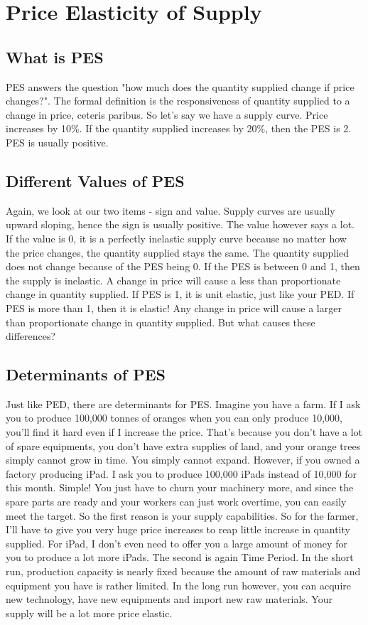 \section{Price Elasticity of Supply}
\subsection{What is PES}
PES answers the question "how much does the quantity supplied change if price changes?". The formal definition is the responsiveness of quantity supplied to a change in price, ceteris paribus. So let's say we have a supply curve. Price increases by 10\%. If the quantity supplied increases by 20\%, then the PES is 2. PES is usually positive.
\subsection{Different Values of PES}
Again, we look at our two items - sign and value. Supply curves are usually upward sloping, hence the sign is usually positive. The value however says a lot. If the value is 0, it is a perfectly inelastic supply curve because no matter how the price changes, the quantity supplied stays the same. The quantity supplied does not change because of the PES being 0. If the PES is between 0 and 1, then the supply is inelastic. A change in price will cause a less than proportionate change in quantity supplied. If PES is 1, it is unit elastic, just like your PED. If PES is more than 1, then it is elastic! Any change in price will cause a larger than proportionate change in quantity supplied. But what causes these differences?
\subsection{Determinants of PES}
Just like PED, there are determinants for PES. Imagine you have a farm. If I ask you to produce 100,000 tonnes of oranges when you can only produce 10,000, you'll find it hard even if I increase the price. That's because you don't have a lot of spare equipments, you don't have extra supplies of land, and your orange trees simply cannot grow in time. You simply cannot expand. However, if you owned a factory producing iPad. I ask you to produce 100,000 iPads instead of 10,000 for this month. Simple! You just have to churn your machinery more, and since the spare parts are ready and your workers can just work overtime, you can easily meet the target. So the first reason is your supply capabilities. So for the farmer, I'll have to give you very huge price increases to reap little increase in quantity supplied. For iPad, I don't even need to offer you a large amount of money for you to produce a lot more iPads. The second is again Time Period. In the short run, production capacity is nearly fixed because the amount of raw materials and equipment you have is rather limited. In the long run however, you can acquire new technology, have new equipments and import new raw materials. Your supply will be a lot more price elastic.
